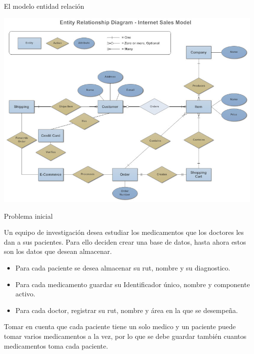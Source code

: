 \documentclass[11pt]{beamer}
\begin{document}
\begin{frame}{El modelo entidad relación}

\begin{center}
\includegraphics[scale=0.3]{images/erd.jpg} 

\end{center}

\end{frame}









\begin{frame}{Problema inicial}

Un equipo de investigación desea estudiar los medicamentos que los doctores les dan a sus pacientes. Para ello deciden crear una base de datos, hasta ahora estos son los datos que desean almacenar.

\begin{itemize}



\item Para cada paciente se desea almacenar su rut, nombre y su diagnostico.

\item Para cada medicamento guardar su Identificador único, nombre y componente activo.

\item Para cada doctor, registrar su rut, nombre y área en la que se desempeña.

\end{itemize}

Tomar en cuenta que cada paciente tiene un solo medico y un paciente puede tomar varios medicamentos a la vez, por lo que se debe guardar también cuantos medicamentos toma cada paciente.

\end{frame}
\end{document}
